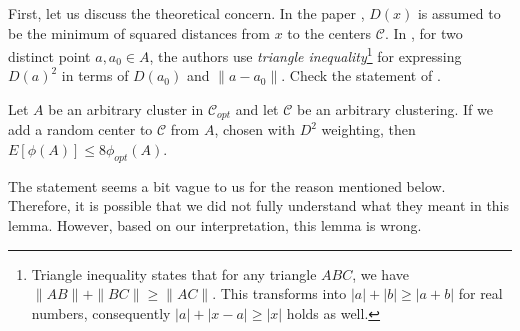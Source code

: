 \documentclass[twoside, 11pt]{article}
\newcommand{\C}{\mathcal{C}}
\begin{document}
	First, let us discuss the theoretical concern. In the paper \cite{kmeans++}, $D(x)$ is assumed to be the minimum of squared distances  from $x$ to the centers $\C$. In \citep[Lemma $3.3$, section $3$]{kmeans++}, for two distinct point $a,a_0\in A$, the authors use \textit{triangle inequality}\footnote{Triangle inequality states that for any triangle $ABC$, we have $\|AB\|+\|BC\|\geq \|AC\|$. This transforms into $|a|+|b|\geq |a+b|$ for real numbers, consequently $|a|+|x-a|\geq |x|$ holds as well.} for expressing $D(a)^2$ in terms of $D(a_0)$ and $\|a-a_0\|$. Check the statement of \citet[Lemma $3.3$]{kmeans++}.
		\begin{lemma}
			Let $A$ be an arbitrary cluster in $\C_{opt}$ and let $\C$ be an arbitrary clustering. If we add a random center to $\C$ from $A$, chosen with $D^2$ weighting, then $E[\phi(A)] \leq 8\phi_{opt}(A)$.
		\end{lemma}
	The statement seems a bit vague to us for the reason mentioned below. Therefore, it is possible that we did not fully understand what they meant in this lemma. However, based on our interpretation, this lemma is wrong.
	
\end{document}
